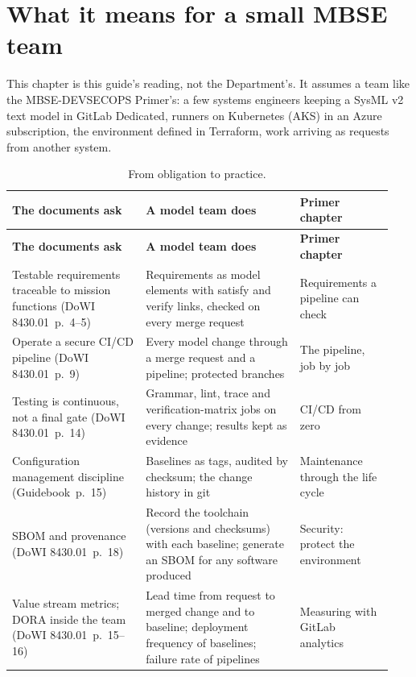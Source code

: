 \documentclass[11pt,letterpaper,twoside,openany]{memoir}
\newcommand{\pg}[2]{{\small(#1~p.~#2)}}          %
\begin{document}
\chapter{What it means for a small MBSE team}\label{ch:team}

This chapter is this guide's reading, not the Department's. It assumes a team like the MBSE-DEVSECOPS Primer's: a few
systems engineers keeping a SysML v2 text model in GitLab Dedicated, runners on Kubernetes (AKS) in an Azure
subscription, the environment defined in Terraform, work arriving as requests from another system.

\begin{longtable}{@{}L{0.33\linewidth}L{0.38\linewidth}L{0.23\linewidth}@{}}
\caption{From obligation to practice.}\label{tab:team}\\
\toprule \sffamily\bfseries The documents ask & \sffamily\bfseries A model team does & \sffamily\bfseries Primer chapter\\ \midrule\endfirsthead
\toprule \sffamily\bfseries The documents ask & \sffamily\bfseries A model team does & \sffamily\bfseries Primer chapter\\ \midrule\endhead
\bottomrule\endfoot
Testable requirements traceable to mission functions \pg{DoWI 8430.01}{4--5} & Requirements as model elements with satisfy and verify links, checked on every merge request & Requirements a pipeline can check\\
Operate a secure CI/CD pipeline \pg{DoWI 8430.01}{9} & Every model change through a merge request and a pipeline; protected branches & The pipeline, job by job\\
Testing is continuous, not a final gate \pg{DoWI 8430.01}{14} & Grammar, lint, trace and verification-matrix jobs on every change; results kept as evidence & CI/CD from zero\\
Configuration management discipline \pg{Guidebook}{15} & Baselines as tags, audited by checksum; the change history in git & Maintenance through the life cycle\\
SBOM and provenance \pg{DoWI 8430.01}{18} & Record the toolchain (versions and checksums) with each baseline; generate an SBOM for any software produced & Security: protect the environment\\
Value stream metrics; DORA inside the team \pg{DoWI 8430.01}{15--16} & Lead time from request to merged change and to baseline; deployment frequency of baselines; failure rate of pipelines & Measuring with GitLab analytics\\

\end{longtable}
\end{document}
